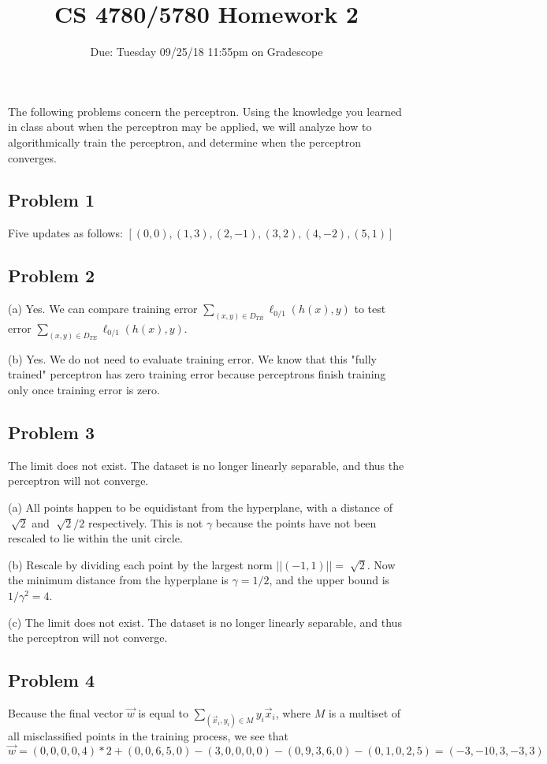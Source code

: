 \documentclass[a4paper]{article}
\title{CS 4780/5780 Homework 2}
\author{Due: Tuesday 09/25/18 11:55pm on Gradescope}
\date{}
\begin{document}
\maketitle

The following problems concern the perceptron. Using the knowledge you learned in class about when the perceptron may be applied, we will analyze how to algorithmically train the perceptron, and determine when the perceptron converges.


\subsection*{Problem 1}

Five updates as follows: $[(0,0), (1,3), (2,-1), (3, 2), (4, -2), (5, 1)]$


\subsection*{Problem 2}

(a) Yes. We can compare training error $\sum_{(x,y)\in D_{TR}} \ell_{0/1}(h(x),y)$ to test error $\sum_{(x,y)\in D_{TE}} \ell_{0/1}(h(x),y)$.

(b) Yes. We do not need to evaluate training error. We know that this "fully trained" perceptron has zero training error because perceptrons finish training only once training error is zero.

\subsection*{Problem 3}

The limit does not exist. The dataset is no longer linearly separable, and thus the perceptron will not converge.

(a) All points happen to be equidistant from the hyperplane, with a distance of $\sqrt[]{2}$ and $\sqrt[]{2}/2$ respectively. This is not $\gamma$ because the points have not been rescaled to lie within the unit circle.

(b) Rescale by dividing each point by the largest norm $||(-1,1)||=\sqrt[]{2}$. Now the minimum distance from the hyperplane is $\gamma=1/2$, and the upper bound is $1/\gamma^2=4$.

(c) The limit does not exist. The dataset is no longer linearly separable, and thus the perceptron will not converge.


\subsection*{Problem 4}
Because the final vector $\vec{w}$ is equal to $\sum_{(\vec{x}_i, y_i) \in M} y_i\vec{x}_i$, where $M$ is a multiset of all misclassified points in the training process, we see that 
$\vec{w} = (0, 0, 0, 0, 4)*2 + (0, 0, 6, 5, 0) - (3, 0, 0, 0, 0) - (0, 9, 3, 6, 0) - (0, 1, 0, 2, 5) = (-3, -10, 3, -3, 3)$
\end{document}
